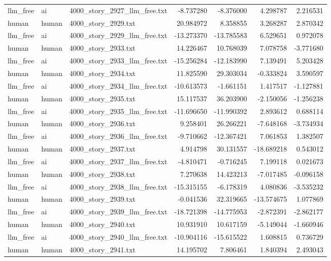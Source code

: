 \begin{longtable}{lllrrrr}
llm\_free & ai & 4000\_story\_2927\_llm\_free.txt & -8.737280 & -8.376000 & 4.298787 & 2.216531 \\
human & human & 4000\_story\_2929.txt & 20.984972 & 8.358855 & 3.268287 & 2.870342 \\
llm\_free & ai & 4000\_story\_2929\_llm\_free.txt & -13.273370 & -13.785583 & 6.529651 & 0.972078 \\
human & human & 4000\_story\_2933.txt & 14.226467 & 10.768039 & 7.078758 & -3.771680 \\
llm\_free & ai & 4000\_story\_2933\_llm\_free.txt & -15.256284 & -12.183990 & 7.139491 & 5.203428 \\
human & human & 4000\_story\_2934.txt & 11.825590 & 29.303034 & -0.333824 & 3.590597 \\
llm\_free & ai & 4000\_story\_2934\_llm\_free.txt & -10.613573 & -1.661151 & 1.417517 & -1.127881 \\
human & human & 4000\_story\_2935.txt & 15.117537 & 36.203900 & -2.150056 & -1.256238 \\
llm\_free & ai & 4000\_story\_2935\_llm\_free.txt & -11.696650 & -11.990392 & 2.893612 & 0.688114 \\
human & human & 4000\_story\_2936.txt & 9.258401 & 26.266221 & -7.648168 & -3.734934 \\
llm\_free & ai & 4000\_story\_2936\_llm\_free.txt & -9.710662 & -12.367421 & 7.061853 & 1.382507 \\
human & human & 4000\_story\_2937.txt & 4.914798 & 30.131557 & -18.689218 & 0.543012 \\
llm\_free & ai & 4000\_story\_2937\_llm\_free.txt & -4.810471 & -0.716245 & 7.199118 & 0.021673 \\
human & human & 4000\_story\_2938.txt & 7.270638 & 14.423213 & -7.017485 & -0.096158 \\
llm\_free & ai & 4000\_story\_2938\_llm\_free.txt & -15.315155 & -6.178319 & 4.080836 & -3.535232 \\
human & human & 4000\_story\_2939.txt & -0.041536 & 32.319665 & -13.574675 & 1.077869 \\
llm\_free & ai & 4000\_story\_2939\_llm\_free.txt & -18.721398 & -14.775953 & -2.872391 & -2.862177 \\
human & human & 4000\_story\_2940.txt & 10.931910 & 10.617159 & -5.149044 & -1.660946 \\
llm\_free & ai & 4000\_story\_2940\_llm\_free.txt & -10.904116 & -15.615522 & 1.608815 & 0.736729 \\
human & human & 4000\_story\_2941.txt & 14.195702 & 7.806461 & 1.840394 & 2.493043 \\

\end{longtable}
